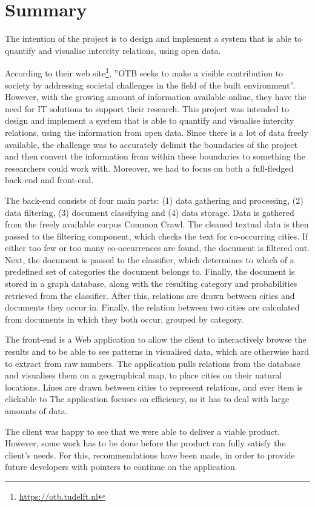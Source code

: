 \chapter*{Summary}
The intention of the project is to design and implement a system that is able to quantify and visualise intercity relations, using open data. 

According to their web site\footnote{\url{https://otb.tudelft.nl}}, ”OTB seeks to make a visible contribution to society by addressing societal challenges in the field of the built environment”. However, with the growing amount of information available online, they have the need for IT solutions to support their research. This project was intended to design and implement a system that is able to quantify and visualise intercity relations, using the information from open data. Since there is a lot of data freely available, the challenge was to accurately delimit the boundaries of the project and then convert the information from within these boundaries to something the researchers could work with. Moreover, we had to focus on both a full-fledged back-end and front-end. 

The back-end consists of four main parts: (1) data gathering and processing, (2) data filtering, (3) document classifying and (4) data storage. Data is gathered from the freely available corpus Common Crawl. The cleaned textual data is then passed to the filtering component, which checks the text for co-occurring cities. If either too few or too many co-occurrences are found, the document is filtered out. Next, the document is passed to the classifier, which determines to which of a predefined set of categories the document belongs to. Finally, the document is stored in a graph database, along with the resulting category and probabilities retrieved from the classifier. After this, relations are drawn between cities and documents they occur in. Finally, the relation between two cities are calculated from documents in which they both occur, grouped by category.

The front-end is a Web application to allow the client to interactively browse the results and to be able to see patterns in visualised data, which are otherwise hard to extract from raw numbers. The application pulls relations from the database and visualises them on a geographical map, to place cities on their natural locations. Lines are drawn between cities to represent relations, and ever item is clickable to The application focuses on efficiency, as it has to deal with large amounts of data.

The client was happy to see that we were able to deliver a viable product. However, some work has to be done before the product can fully satisfy the client’s needs. For this, recommendations have been made, in order to provide future developers with pointers to continue on the application.